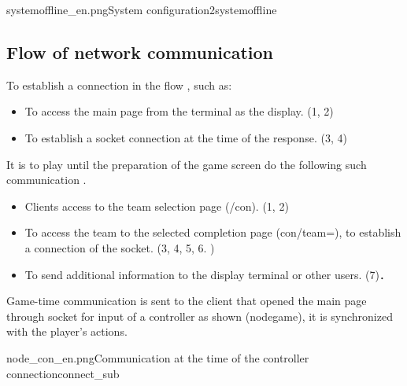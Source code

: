 {systemoffline_en.png}{System configuration2}{systemoffline}

\subsection{Flow of network communication}
To establish a connection in the flow , such as:
\begin{itemize}
    \item To access the main page from the terminal as the display. (1, 2)
    \item To establish a socket connection at the time of the response. (3, 4)
\end{itemize}

It is to play until the preparation of the game screen do the following such communication .

\begin{itemize}
    \item Clients access to the team selection page (/con). (1, 2)
    \item To access the team to the selected completion page (con/team=), to establish a connection of the socket. (3, 4, 5, 6. )
    \item To send additional information to the display terminal or other users. (7)．
\end{itemize}

Game-time communication is sent to the client that opened the main page through socket for input of a controller as shown \figref(nodegame), it is synchronized with the player's actions.

{node_con_en.png}{Communication at the time of the controller connection}{connect_sub}


\newpage

